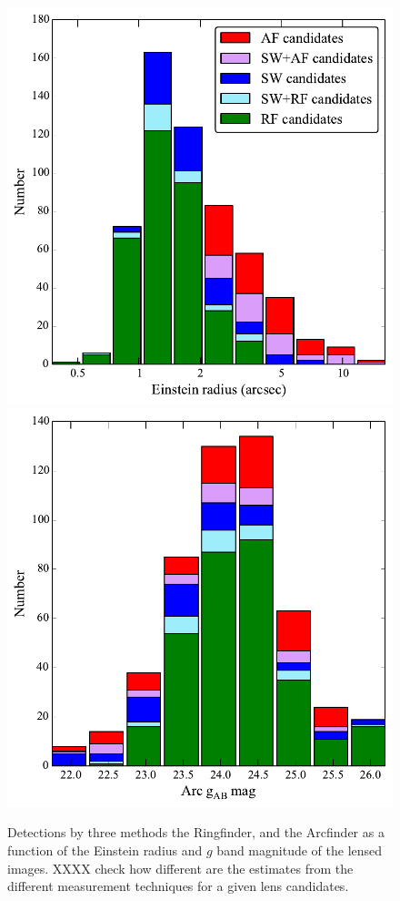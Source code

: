 \documentclass[useAMS,usenatbib,a4paper]{mn2e}
\begin{document}
\begin{figure}
\begin{center}
\includegraphics[scale=0.6]{sw-cfhtls-figs/stacked_lenscand_rein.pdf}
\includegraphics[scale=0.6]{sw-cfhtls-figs/stacked_lenscand_mag.pdf}
\caption{ \label{fig:stackre}
Detections by three methods the Ringfinder, \sw and the Arcfinder as a
function of the Einstein radius and $g$ band magnitude of the lensed
images. XXXX check how different are the estimates from the different measurement techniques for a given lens candidates. }
\end{center}
\end{figure}
\end{document}
